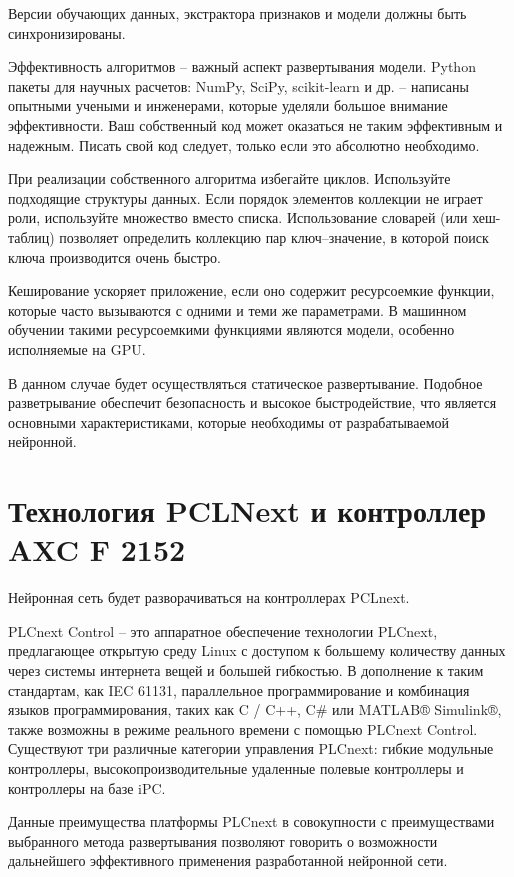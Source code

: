 Версии обучающих данных, экстрактора признаков и модели должны быть синхронизированы.

Эффективность алгоритмов {--} важный аспект развертывания модели.	Python пакеты для научных расчетов: NumPy, SciPy, scikit-learn и др. {--} написаны опытными учеными и инженерами, которые уделяли большое внимание эффективности. Ваш собственный код может оказаться не таким эффективным и надежным. Писать свой код следует, только если это абсолютно необходимо.

При реализации собственного алгоритма избегайте циклов. Используйте подходящие структуры данных. Если порядок элементов коллекции не играет роли, используйте множество вместо списка. Использование словарей (или хеш-таблиц) позволяет определить коллекцию пар ключ–значение, в которой поиск ключа производится очень быстро.

Кеширование ускоряет приложение, если оно содержит ресурсоемкие функции, которые часто вызываются с одними и теми же параметрами. В машинном обучении такими ресурсоемкими функциями являются модели, особенно исполняемые на GPU.

В данном случае будет осуществляться статическое развертывание. Подобное разветрывание обеспечит безопасность и высокое быстродействие, что является основными характеристиками, которые необходимы от разрабатываемой нейронной.

\section{Технология PCLNext и контроллер AXC F 2152}

Нейронная сеть будет разворачиваться на контроллерах PCLnext.

PLCnext Control {--} это аппаратное обеспечение технологии PLCnext, предлагающее открытую среду Linux с доступом к большему количеству данных через системы интернета вещей и большей гибкостью. В дополнение к таким стандартам, как IEC 61131, параллельное программирование и комбинация языков программирования, таких как C / C++, C\# или MATLAB® Simulink®, также возможны в режиме реального времени с помощью PLCnext Control. Существуют три различные категории управления PLCnext: гибкие модульные контроллеры, высокопроизводительные удаленные полевые контроллеры и контроллеры на базе iPC.

Данные преимущества платформы PLCnext в совокупности с преимуществами выбранного метода развертывания позволяют говорить о возможности дальнейшего эффективного применения разработанной нейронной сети.

